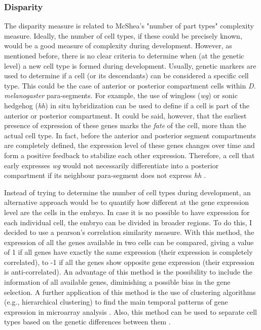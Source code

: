 \subsubsection{Disparity}

The disparity measure is related to  McShea's "number of part types" complexity measure. Ideally, the number of cell types, if these could be precisely known, would be a good measure of complexity during development. However, as mentioned before, there is no clear criteria to determine when (at the genetic level) a new cell type is formed during development. 
Usually, genetic markers are used to determine if a cell (or its descendants) can be considered a specific cell type. This could be the case of anterior or posterior compartment cells within \textit{D. melanogaster} para-segments. For example, the use of wingless (\textit{wg}) or sonic hedgehog (\textit{hh}) in situ hybridization can be used to define if a cell is part of the anterior or posterior compartment. It could be said, however, that the earliest presence of expression of these genes marks the \textit{fate} of the cell, more than the actual cell type. In fact, before the anterior and posterior segment compartments are completely defined, the expression level of these genes changes over time and form a positive feedback to stabilize each other expression. Therefore, a cell that early expresses \textit{wg} would not necessarily differentiate into a posterior compartment if its neighbour para-segment does not express \textit{hh} \citep{Bejsovec1991}.
 
Instead of trying to determine the number of cell types during development, an alternative approach would be to quantify how different at the gene expression level are the cells in the embryo. In case it is no possible to have expression for each individual cell, the embryo can be divided in broader regions. To do this, I decided to use a pearson's correlation similarity measure. With this method, the expression of all the genes available in two cells can be compared, giving a value of 1 if all genes have exactly the same expression (their expression is completely correlated), to -1 if all the genes show opposite gene expression (their expression is anti-correlated). An advantage of this method is the possibility to include the information of all available genes, diminishing a possible bias in the gene selection. A further application of this method is the use of clustering algorithms (e.g., hierarchical clustering) to find the main temporal patterns of gene expression in microarray analysis \citep{Eisen1998,Wen1998}. Also, this method can be used to separate cell types based on the genetic differences between them \citep{gohlmann2009gene}.

